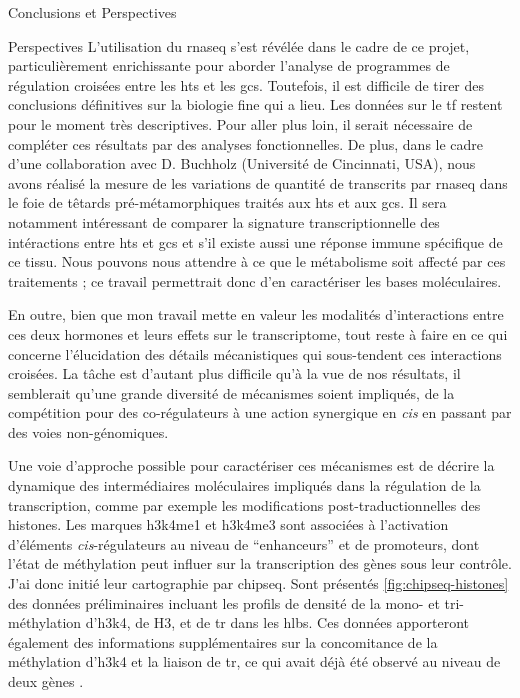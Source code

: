 \documentclass[../main.tex]{subfiles}
\begin{document}
\begin{chapter}{Conclusions et Perspectives}
\begin{section}{Perspectives}
L'utilisation du \gls{rnaseq} s'est révélée dans le cadre de ce projet, particulièrement enrichissante pour aborder l'analyse de programmes de régulation croisées entre les \glspl{ht} et les \glspl{gc}.
Toutefois, il est difficile de tirer des conclusions définitives sur la biologie fine qui a lieu.
Les données sur le \gls{tf} restent pour le moment très descriptives.
Pour aller plus loin, il serait nécessaire de compléter ces résultats par des analyses fonctionnelles.
De plus, dans le cadre d'une collaboration avec D. Buchholz (Université de Cincinnati, USA), nous avons réalisé la mesure de les variations de quantité de transcrits par \gls{rnaseq} dans le foie de têtards pré-métamorphiques traités aux \glspl{ht} et aux \glspl{gc}.
Il sera notamment intéressant de comparer la signature transcriptionnelle des intéractions entre \glspl{ht} et \glspl{gc} et s'il existe aussi une réponse immune spécifique de ce tissu.
Nous pouvons nous attendre à ce que le métabolisme soit affecté par ces traitements ; ce travail permettrait donc d'en caractériser les bases moléculaires.
\par
En outre, bien que mon travail mette en valeur les modalités d'interactions entre ces deux hormones et leurs effets sur le transcriptome, tout reste à faire en ce qui concerne l'élucidation des détails mécanistiques qui sous-tendent ces interactions croisées.
La tâche est d'autant plus difficile qu'à la vue de nos résultats, il semblerait qu'une grande diversité de mécanismes soient impliqués, de la compétition pour des co-régulateurs à une action synergique en \textit{cis} en passant par des voies non-génomiques.
\par
Une voie d'approche possible pour caractériser ces mécanismes est de décrire la dynamique des intermédiaires moléculaires impliqués dans la régulation de la transcription, comme par exemple les modifications post-traductionnelles des histones.
Les marques \gls{h3k4me1} et \gls{h3k4me3} sont associées à l'activation d'éléments \textit{cis}-régulateurs au niveau de ``enhanceurs'' et de promoteurs, dont l'état de méthylation peut influer sur la transcription des gènes sous leur contrôle.
J'ai donc initié leur cartographie par \gls{chipseq}.
Sont présentés \autoref{fig:chipseq-histones} des données préliminaires incluant les profils de densité de la mono- et tri-méthylation d'\gls{h3k4}, de H3, et de \gls{tr} dans les \glspl{hlb}.
Ces données apporteront également des informations supplémentaires sur la concomitance de la méthylation d'\gls{h3k4} et la liaison de \gls{tr}, ce qui avait déjà été observé au niveau de deux gènes \citep{Bilesimo2011}.


\end{section}
\end{chapter}
\end{document}
